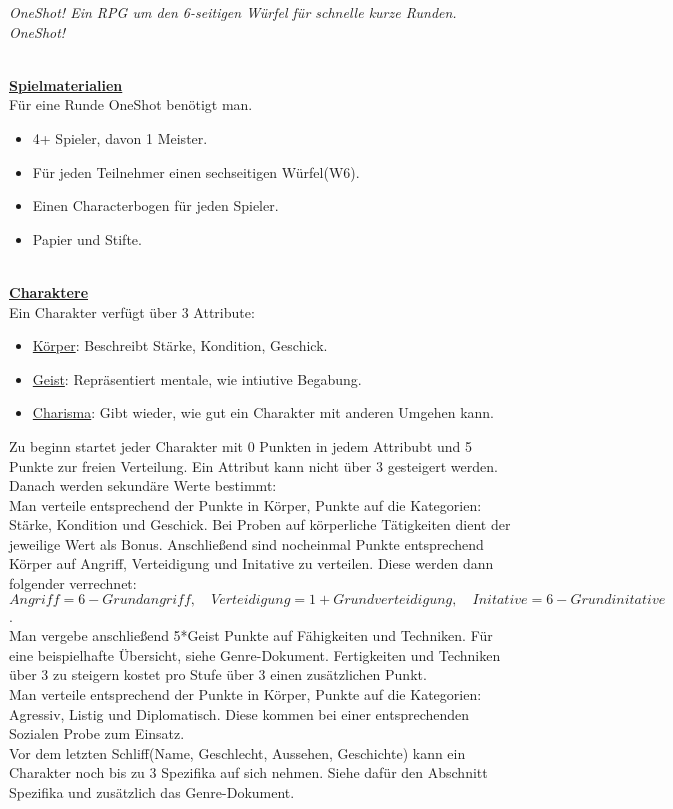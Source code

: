 \documentclass[twoside,a4paper]{minimal}
\begin{document}
\textit{OneShot! Ein RPG um den 6-seitigen Würfel für schnelle kurze Runden. OneShot!}
\setlength{\columnsep}{5pt}
\begin{multicols*}{3}
\textbf{\uline{\\Spielmaterialien}}
\\Für eine Runde OneShot benötigt man.
\begin{itemize}
\item 4+ Spieler, davon 1 Meister.
\item Für jeden Teilnehmer einen sechseitigen Würfel(W6).
\item Einen Characterbogen für jeden Spieler.
\item Papier und Stifte.
\end{itemize}
\textbf{\uline{\\Charaktere}}
\\Ein Charakter verfügt über 3 Attribute:
\begin{itemize}
\item \uline{Körper}: Beschreibt Stärke, Kondition, Geschick. 
\item \uline{Geist}: Repräsentiert mentale, wie intiutive Begabung.
\item \uline{Charisma}: Gibt wieder, wie gut ein Charakter mit anderen Umgehen kann.
\end{itemize}
Zu beginn startet jeder Charakter mit 0 Punkten in jedem Attribubt und 5 Punkte zur freien Verteilung. Ein Attribut kann nicht über 3 gesteigert werden. Danach werden sekundäre Werte bestimmt:
\\Man verteile entsprechend der Punkte in Körper, Punkte auf die Kategorien: Stärke, Kondition und Geschick. Bei Proben auf körperliche Tätigkeiten dient der jeweilige Wert als Bonus. Anschließend sind nocheinmal Punkte entsprechend Körper auf Angriff, Verteidigung und Initative zu verteilen. Diese werden dann folgender verrechnet: $Angriff=6-Grundangriff,\quad Verteidigung=1+Grundverteidigung,\quad Initative=6-Grundinitative$.
\\Man vergebe anschließend 5*Geist Punkte auf Fähigkeiten und Techniken. Für eine beispielhafte Übersicht, siehe Genre-Dokument. Fertigkeiten und Techniken über 3 zu steigern kostet pro Stufe über 3 einen zusätzlichen Punkt.
\\Man verteile entsprechend der Punkte in Körper, Punkte auf die Kategorien: Agressiv, Listig und Diplomatisch. Diese kommen bei einer entsprechenden Sozialen Probe zum Einsatz.
\\Vor dem letzten Schliff(Name, Geschlecht, Aussehen, Geschichte) kann ein Charakter noch bis zu 3 Spezifika auf sich nehmen. Siehe dafür den Abschnitt Spezifika und zusätzlich das Genre-Dokument.

\end{multicols*}
\end{document}
